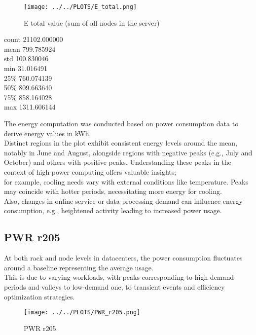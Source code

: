 \begin{figure}[H]
\centering
\texttt{[image: ../../PLOTS/E\_total.png]}
\captionsetup{skip=-10pt}
\caption{E total value (sum of all nodes in the server)}
\label{fig:E_total}
\end{figure}

\begin{center}
count    21102.000000 \\
mean       799.785924 \\
std        100.830046 \\
min         31.016491 \\
25\%        760.074139 \\
50\%        809.663640 \\
75\%        858.164028 \\
max       1311.606144
\end{center}

\noindent
The energy computation was conducted based on power consumption data to derive energy values in kWh. \\
Distinct regions in the plot exhibit consistent energy levels around the mean, notably in June and August, alongside regions with negative peaks (e.g., July and October) and others with positive peaks. Understanding these peaks in the context of high-power computing offers valuable insights; \\
for example, cooling needs vary with external conditions like temperature. Peaks may coincide with hotter periods, necessitating more energy for cooling. \\
Also, changes in online service or data processing demand can influence energy consumption, e.g., heightened activity leading to increased power usage.
\clearpage 

\subsection{PWR r205}
At both rack and node levels in datacenters, the power consumption fluctuates around a baseline representing the average usage.\\This is due to varying workloads, with peaks corresponding to high-demand periods and valleys to low-demand one, to transient events and efficiency optimization strategies.

\vspace{-5pt}

\begin{figure}[H]
\centering
\texttt{[image: ../../PLOTS/PWR\_r205.png]}
\captionsetup{skip=-10pt}
\caption{PWR r205}
\label{fig:PWR_r205}
\end{figure}

